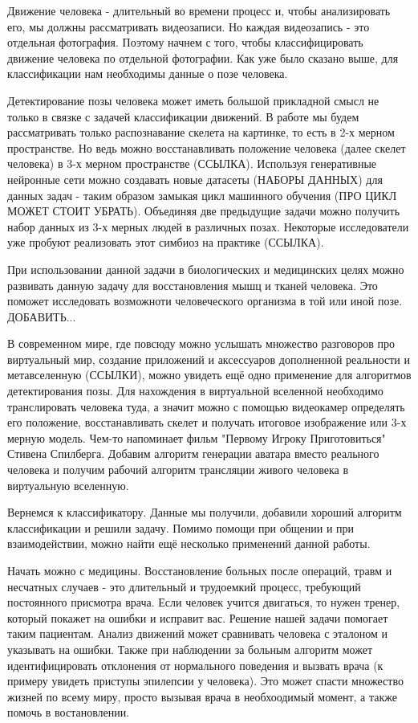 Движение человека - длительный во времени процесс и, чтобы анализировать его, мы должны рассматривать видеозаписи. Но каждая видеозапись - это отдельная фотография. Поэтому начнем с того, чтобы классифицировать движение человека по отдельной фотографии. Как уже было сказано выше, для классификации нам необходимы данные о позе человека.

\hfill \break
Детектирование позы человека может иметь большой прикладной смысл не только в связке с задачей классификации движений. В работе мы будем рассматривать только распознавание скелета на картинке, то есть в 2-х мерном пространстве. Но ведь можно восстанавливать положение человека (далее скелет человека) в 3-х мерном пространстве (ССЫЛКА). Используя генеративные нейронные сети можно создавать новые датасеты (НАБОРЫ ДАННЫХ) для данных задач - таким образом замыкая цикл машинного обучения (ПРО ЦИКЛ МОЖЕТ СТОИТ УБРАТЬ). Объединяя две предыдущие задачи можно получить набор данных из 3-х мерных людей в различных позах. Некоторые исследователи уже пробуют реализовать этот симбиоз на практике (ССЫЛКА). 

При использовании данной задачи в биологических и медицинских целях можно развивать данную задачу для восстановления мышц и тканей человека. Это поможет исследовать возможноти человеческого организма в той или иной позе. ДОБАВИТЬ...

В современном мире, где повсюду можно услышать множество разговоров про виртуальный мир, создание приложений и аксессуаров дополненной реальности и метавселенную (ССЫЛКИ), можно увидеть ещё одно применение для алгоритмов детектирования позы. Для нахождения в виртуальной вселенной необходимо транслировать человека туда, а значит можно с помощью видеокамер определять его положение, восстанавливать скелет и получать итоговое изображение или 3-х мерную модель. Чем-то напоминает фильм "Первому Игроку Приготовиться"{} Стивена Спилберга. Добавим алгоритм генерации аватара вместо реального человека и получим рабочий алгоритм трансляции живого человека в виртуальную вселенную.

\hfill \break
Вернемся к классификатору. Данные мы получили, добавили хороший алгоритм классификации и решили задачу. Помимо помощи при общении и при взаимодействии, можно найти ещё несколько применений данной работы. 

Начать можно с медицины. Восстановление больных после операций, травм и несчатных случаев - это длительный и трудоемкий процесс, требующий постоянного присмотра врача. Если человек учится двигаться, то нужен тренер, который покажет на ошибки и исправит вас. Решение нашей задачи помогает таким пациентам. Анализ движений может сравнивать человека с эталоном и указывать на ошибки. Также при наблюдении за больным алгоритм может идентифицировать отклонения от нормального поведения и вызвать врача (к примеру увидеть приступы эпилепсии у человека). Это может спасти множество жизней по всему миру, просто вызывая врача в необхоодимый момент, а также помочь в востановлении.

